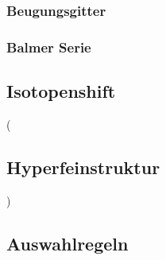 \documentclass[]{article}
\begin{document}
\subsubsection{Beugungsgitter}

\subsubsection{Balmer Serie}
\subsection{Isotopenshift}



(\subsection{Hyperfeinstruktur})
\subsection{Auswahlregeln} %
\end{document}

